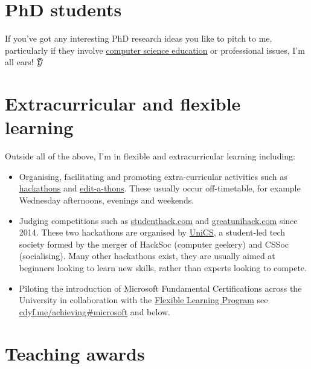 \documentclass[
  12pt,
]{book}
\providecommand{\tightlist}{%
  \setlength{\itemsep}{0pt}\setlength{\parskip}{0pt}}
\begin{document}
\hypertarget{phds}{%
\section{PhD students}\label{phds}}

If you've got any interesting PhD research ideas you like to pitch to me, particularly if they involve \href{https://sigcse.cs.manchester.ac.uk}{computer science education} or professional issues, I'm all ears! 👂

\hypertarget{extra}{%
\section{Extracurricular and flexible learning}\label{extra}}

Outside all of the above, I'm in flexible and extracurricular learning including:

\begin{itemize}
\tightlist
\item
  Organising, facilitating and promoting extra-curricular activities such as \href{https://en.wikipedia.org/wiki/Hackathon}{hackathons} \citep{Briscoe, Warner2017} and \href{https://en.wikipedia.org/wiki/Edit-a-thon}{edit-a-thons}. \citep{goodbadugly, troubled, findingada2019} These usually occur off-timetable, for example Wednesday afternoons, evenings and weekends.
\item
  Judging competitions such as \href{https://www.studenthack.com}{studenthack.com} and \href{https://greatunihack.com}{greatunihack.com} since 2014. These two hackathons are organised by \href{https://www.unicsmcr.com/}{UniCS}, a student-led tech society formed by the merger of HackSoc (computer geekery) and CSSoc (socialising). Many other hackathons exist, they are usually aimed at beginners looking to learn new skills, rather than experts looking to compete. \citep{Briscoe, hafb}
\item
  Piloting the introduction of Microsoft Fundamental Certifications across the University in collaboration with the \href{https://www.manchester.ac.uk/discover/teaching-and-learning-excellence/flexible-learning/}{Flexible Learning Program} see \href{https://www.cdyf.me/achieving\#microsoft}{cdyf.me/achieving\#microsoft} and below. \citep{georgepettifer}
\end{itemize}

\hypertarget{awards}{%
\section{Teaching awards}\label{awards}}
\end{document}
